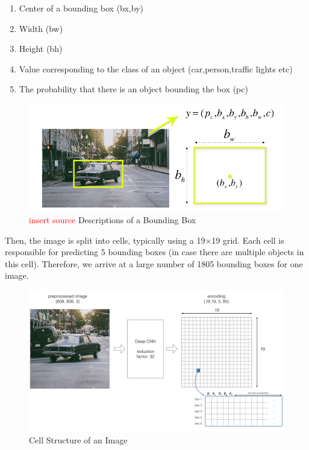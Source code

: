 \documentclass[a4paper]{article}
\begin{document}
\begin{enumerate}
    \item Center of a bounding box (bx,by)
    \item Width (bw)
    \item Height (bh)
    \item Value corresponding to the class of an object (car,person,traffic lights etc)
    \item The probability that there is an object bounding the box (pc)
\end{enumerate}

\begin{figure}[h!]
    \centering
    \includegraphics[width=\linewidth]{Pictures/yoloWorks1.png}
    \caption{\textcolor{red}{insert source} Descriptions of a Bounding Box}
    \label{fig:descriptionOfBBox}
\end{figure}

Then, the image is split into cells, typically using a 19×19 grid. Each cell is responsible for predicting 5 bounding boxes (in case there are multiple objects in this cell). Therefore, we arrive at a large number of 1805 bounding boxes for one image.

\begin{figure}[h!]
    \centering
    \includegraphics[width=\linewidth]{Pictures/yoloWorks2.png}
    \caption{Cell Structure of an Image}
    \label{fig:StructImg}
\end{figure}
\end{document}
